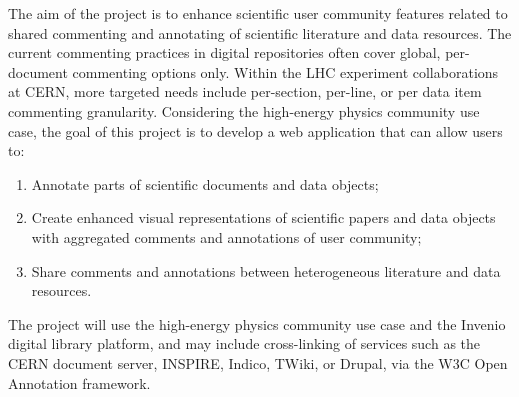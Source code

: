 
The aim of the project is to enhance scientific user community features related
to shared commenting and annotating of scientific literature and data
resources.  The current commenting practices in digital repositories often
cover global, per-document commenting options only. Within the LHC experiment
collaborations at CERN, more targeted needs include per-section, per-line, or
per data item commenting granularity. Considering the high-energy physics
community use case, the goal of this project is to develop a web application
that can allow users to:

\begin{enumerate}
  \item Annotate parts of scientific documents and data objects;
  \item Create enhanced visual representations of scientific papers and data
        objects with aggregated comments and annotations of user community;
  \item Share comments and annotations between heterogeneous literature and data
        resources.
\end{enumerate}

The project will use the high-energy physics community use case and the Invenio
digital library platform, and may include cross-linking of services such as the
CERN document server, INSPIRE, Indico, TWiki, or Drupal, via the W3C Open
Annotation framework.

